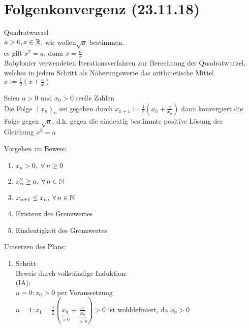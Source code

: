 \documentclass[../ana1u.tex]{subfiles}
\begin{document}
\setcounter{section}{4}

\section{Folgenkonvergenz (23.11.18)}
\begin{bsp}
    Quadratwurzel\\
    \(a > 0, a \in \mathbb{R}\), wir wollen\(\sqrt{a}\) bestimmen.\\
    es gilt \(x^2 = a\), dann \(x = \frac{a}{x}\)\vspace{5mm}\\
    Babylonier verwendeten Iterationsverfahren zur Berechnung der Quadratwurzel, welches in jedem Schritt als Näherungswerte das arithmetische Mittel\vspace{5mm}\\
    \(x := \frac{1}{2}(x+\frac{a}{x})\)
    \begin{beh}
        Seien \(a > 0\) und \(x_0 > 0\) reelle Zahlen\\
        Die Folge \((x_n)_n\) sei gegeben durch \(x_{n+1} := \frac{1}{2}(x_n + \frac{a}{x_n})\) dann konvergiert die Folge gegen \(\sqrt{a}\), d.h. gegen die eindeutig bestimmte positive Lösung der Gleichung \(x^2 = a\)
    \end{beh}		
    Vorgehen im Beweis:
    \begin{enumerate}
        \item \(x_n > 0, \; \forall \, n \geq 0\)
        \item \(x_n^2 \geq a, \; \forall \, n \in \mathbb{N}\)
        \item \(x_{n+1} \leq x_n, \; \forall \, n \in \mathbb{N}\)
        \item Existenz des Grenzwertes
        \item Eindeutigkeit des Grenzwertes
    \end{enumerate}
    \begin{bew}
        Umsetzen des Plans:
        \begin{enumerate}				
            \item Schritt:\\
                Beweis durch vollständige Induktion:\\
                (IA):\\
                \(n=0: x_0 > 0\) per Voraussetzung\\
                \(n=1: x_1 = \frac{1}{2}(\underbrace{x_0}_{>0} + \underbrace{\frac{a}{x_0}}_{>0}) > 0\) ist wohldefiniert, da \(x_0 > 0\)\\

\end{enumerate}
\end{bew}
\end{bsp}
\end{document}
